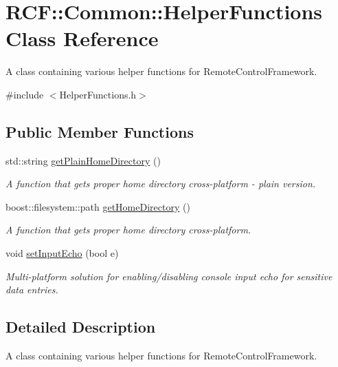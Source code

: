\hypertarget{class_r_c_f_1_1_common_1_1_helper_functions}{}\section{R\+C\+F\+:\+:Common\+:\+:Helper\+Functions Class Reference}
\label{class_r_c_f_1_1_common_1_1_helper_functions}


A class containing various helper functions for Remote\+Control\+Framework.  




{\ttfamily \#include $<$Helper\+Functions.\+h$>$}

\subsection*{Public Member Functions}
\begin{DoxyCompactItemize}
\item 
std\+::string \hyperlink{class_r_c_f_1_1_common_1_1_helper_functions_a78cc71a8664db194f25e2284f3b2d46a}{get\+Plain\+Home\+Directory} ()
\begin{DoxyCompactList}\small\item\em A function that gets proper home directory cross-\/platform -\/ plain version. \end{DoxyCompactList}\item 
boost\+::filesystem\+::path \hyperlink{class_r_c_f_1_1_common_1_1_helper_functions_aad8b0c0c2e1361e155fd447bde5aa67d}{get\+Home\+Directory} ()
\begin{DoxyCompactList}\small\item\em A function that gets proper home directory cross-\/platform. \end{DoxyCompactList}\item 
void \hyperlink{class_r_c_f_1_1_common_1_1_helper_functions_a35c3890ec6935b09e2dc3ba0a7c111c0}{set\+Input\+Echo} (bool e)
\begin{DoxyCompactList}\small\item\em Multi-\/platform solution for enabling/disabling console input echo for sensitive data entries. \end{DoxyCompactList}\end{DoxyCompactItemize}


\subsection{Detailed Description}
A class containing various helper functions for Remote\+Control\+Framework. 

